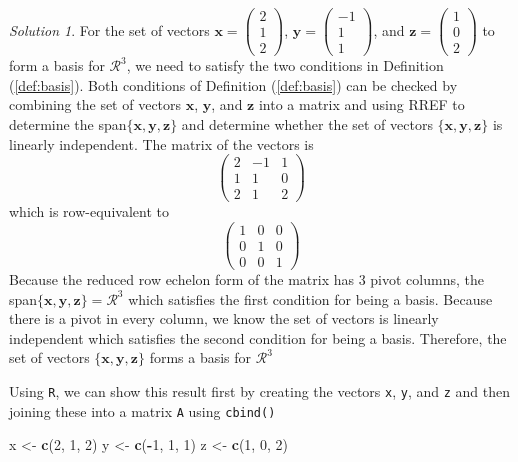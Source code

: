 \documentclass[
]{book}
\newenvironment{Shaded}{\begin{snugshade}}{\end{snugshade}}
\newcommand{\DecValTok}[1]{\textcolor[rgb]{0.00,0.00,0.81}{#1}}
\newcommand{\KeywordTok}[1]{\textcolor[rgb]{0.13,0.29,0.53}{\textbf{#1}}}
\newcommand{\NormalTok}[1]{#1}
\newcommand{\OperatorTok}[1]{\textcolor[rgb]{0.81,0.36,0.00}{\textbf{#1}}}
\newcommand{\StringTok}[1]{\textcolor[rgb]{0.31,0.60,0.02}{#1}}
\theoremstyle{definition}
\theoremstyle{definition}
\theoremstyle{definition}
\theoremstyle{remark}
\newtheorem*{solution}{Solution}
\begin{document}
\begin{solution}

For the set of vectors \(\mathbf{x} = \begin{pmatrix} 2 \\ 1 \\ 2 \end{pmatrix}\), \(\mathbf{y} = \begin{pmatrix} -1 \\ 1 \\ 1 \end{pmatrix}\), and \(\mathbf{z} = \begin{pmatrix} 1 \\ 0 \\ 2 \end{pmatrix}\) to form a basis for \(\mathcal{R}^3\), we need to satisfy the two conditions in Definition (\ref{def:basis}). Both conditions of Definition (\ref{def:basis}) can be checked by combining the set of vectors \(\mathbf{x}\), \(\mathbf{y}\), and \(\mathbf{z}\) into a matrix and using RREF to determine the span\(\{ \mathbf{x}, \mathbf{y}, \mathbf{z} \}\) and determine whether the set of vectors \(\{ \mathbf{x}, \mathbf{y}, \mathbf{z} \}\) is linearly independent. The matrix of the vectors is
\[
\begin{pmatrix} 2 & -1 & 1 \\ 1 & 1 & 0 \\ 2 & 1 & 2 \end{pmatrix}
\]
which is row-equivalent to
\[
\begin{pmatrix} 1 & 0 & 0 \\ 0 & 1 & 0 \\ 0 & 0 & 1 \end{pmatrix}
\]
Because the reduced row echelon form of the matrix has 3 pivot columns, the span\(\{ \mathbf{x}, \mathbf{y}, \mathbf{z} \} = \mathcal{R}^3\) which satisfies the first condition for being a basis. Because there is a pivot in every column, we know the set of vectors is linearly independent which satisfies the second condition for being a basis. Therefore, the set of vectors \(\{ \mathbf{x}, \mathbf{y}, \mathbf{z} \}\) forms a basis for \(\mathcal{R}^3\)

Using \texttt{R}, we can show this result first by creating the vectors \texttt{x}, \texttt{y}, and \texttt{z} and then joining these into a matrix \texttt{A} using \texttt{cbind()}

\begin{Shaded}
\begin{Highlighting}[]
\NormalTok{x <-}\StringTok{ }\KeywordTok{c}\NormalTok{(}\DecValTok{2}\NormalTok{, }\DecValTok{1}\NormalTok{, }\DecValTok{2}\NormalTok{)}
\NormalTok{y <-}\StringTok{ }\KeywordTok{c}\NormalTok{(}\OperatorTok{-}\DecValTok{1}\NormalTok{, }\DecValTok{1}\NormalTok{, }\DecValTok{1}\NormalTok{)}
\NormalTok{z <-}\StringTok{ }\KeywordTok{c}\NormalTok{(}\DecValTok{1}\NormalTok{, }\DecValTok{0}\NormalTok{, }\DecValTok{2}\NormalTok{)}


\end{Highlighting}
\end{Shaded}
\end{solution}
\end{document}
